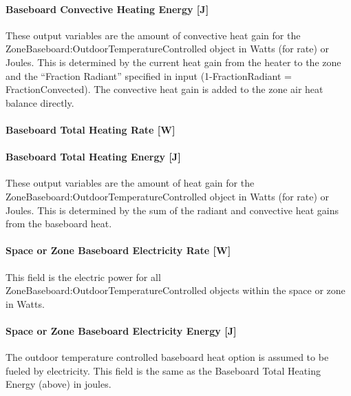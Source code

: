 \paragraph{Baseboard Convective Heating Energy {[}J{]}}\label{baseboard-convective-heating-energy-j-2a}

These output variables are the amount of convective heat gain for the Zone\-Baseboard:\-Outdoor\-Temperature\-Controlled object in Watts (for rate) or Joules. This is determined by the current heat gain from the heater to the zone and the ``Fraction Radiant'' specified in input (1-FractionRadiant = FractionConvected). The convective heat gain is added to the zone air heat balance directly.

\paragraph{Baseboard Total Heating Rate {[}W{]}}\label{baseboard-total-heating-rate-w-2a}

\paragraph{Baseboard Total Heating Energy {[}J{]}}\label{baseboard-total-heating-energy-j-2a}

These output variables are the amount of heat gain for the Zone\-Baseboard:\-Outdoor\-Temperature\-Controlled object in Watts (for rate) or Joules. This is determined by the sum of the radiant and convective heat gains from the baseboard heat.

\paragraph{Space or Zone Baseboard Electricity Rate {[}W{]}}\label{zone-baseboard-electric-power-w-2}

This field is the electric power for all Zone\-Baseboard:\-Outdoor\-Temperature\-Controlled objects within the space or zone in Watts.

\paragraph{Space or Zone Baseboard Electricity Energy {[}J{]}}\label{zone-baseboard-electric-energy-j-2}

The outdoor temperature controlled baseboard heat option is assumed to be fueled by electricity. This field is the same as the Baseboard Total Heating Energy (above) in joules.

